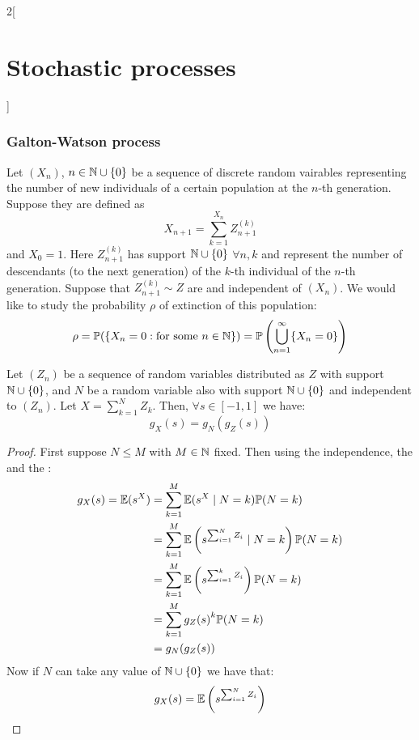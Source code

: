 \documentclass[../../../main_math.tex]{subfiles}
\begin{document}
\begin{multicols}{2}[\section{Stochastic processes}]
  \subsubsection{Galton-Watson process}
  \begin{model}\label{SP:galtonwatsonModel}
    Let $(X_n)$, $n\in\mathbb{N}\cup\{0\}$ be a sequence of discrete random vairables representing the number of new individuals of a certain population at the $n$-th generation. Suppose they are defined as $$X_{n+1}=\sum_{k=1}^{X_n}Z_{n+1}^{(k)}$$ and $X_0=1$. Here $Z_{n+1}^{(k)}$ has support $\mathbb{N}\cup\{0\}$ $\forall n,k$ and represent the number of descendants (to the next generation) of the $k$-th individual of the $n$-th generation. Suppose that $Z_{n+1}^{(k)}\sim Z$ are \iid and independent of $(X_n)$. We would like to study the probability $\rho$ of extinction of this population: $$\rho=\mathbb{P}(\{X_n=0:\text{for some $n\in\mathbb{N}$}\})=\mathbb{P}\left(\bigcup_{n=1}^\infty\{X_n=0\}\right)$$
  \end{model}
  \begin{lemma}\label{SP:lemmaGaltonWatson}
    Let $(Z_n)$ be a sequence of \iid random variables distributed as $Z$ with support $\mathbb{N}\cup\{0\}$, and $N$ be a random variable also with support $\mathbb{N}\cup\{0\}$ and independent to $(Z_n)$. Let $X=\sum_{k=1}^NZ_k$. Then, $\forall s\in[-1,1]$ we have: $$g_X(s)=g_N(g_Z(s))$$
  \end{lemma}
  \begin{proof}
    First suppose $N\leq M$ with $M\in\mathbb{N}$ fixed. Then using the independence, the  and the :
    \begin{align*}
      g_X(s)=\mathbb{E}(s^X) & =\sum_{k=1}^M\mathbb{E}(s^X\mid N=k)\mathbb{P}(N=k)                                        \\
                       & = \sum_{k=1}^{M} \mathbb{E}\left(s^{\sum_{i=1}^{N}Z_i} \mid N = k\right) \mathbb{P}(N = k) \\
                       & = \sum_{k=1}^{M} \mathbb{E}\left(s^{\sum_{i=1}^{k}Z_i}\right) \mathbb{P}(N = k)            \\
                       & = \sum_{k=1}^{M} {g_Z(s)}^k \mathbb{P}(N = k)                                        \\
                       & = g_N(g_Z(s))
    \end{align*}
    Now if $N$ can take any value of $\mathbb{N}\cup\{0\}$ we have that:
    \begin{align*}
      g_X(s) & =\Exp\left(s^{\sum_{i=1}^{N}Z_i}\right)                          \\

\end{align*}
\end{proof}
\end{multicols}
\end{document}
